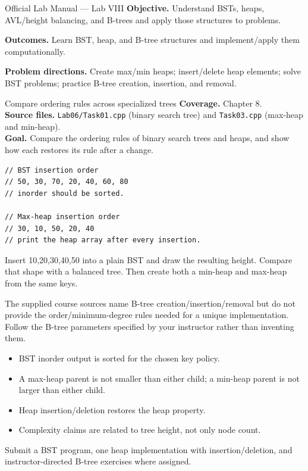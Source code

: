 
\begin{sourcealignment}{Official Lab Manual --- Lab VIII}
\textbf{Objective.} Understand BSTs, heaps, AVL/height balancing, and B-trees and apply those structures to problems.

\textbf{Outcomes.} Learn BST, heap, and B-tree structures and implement/apply them computationally.

\textbf{Problem directions.} Create max/min heaps; insert/delete heap elements; solve BST problems; practice B-tree creation, insertion, and removal.
\end{sourcealignment}

\begin{labproject}{Compare ordering rules across specialized trees}
\textbf{Coverage.} Chapter 8.\\
\textbf{Source files.} \texttt{Lab06/Task01.cpp} (binary search tree) and \texttt{Task03.cpp} (max-heap and min-heap).\\
\textbf{Goal.} Compare the ordering rules of binary search trees and heaps, and show how each restores its rule after a change.

\begin{lstlisting}
// BST insertion order
// 50, 30, 70, 20, 40, 60, 80
// inorder should be sorted.

// Max-heap insertion order
// 30, 10, 50, 20, 40
// print the heap array after every insertion.
\end{lstlisting}

\begin{tryit}
Insert 10,20,30,40,50 into a plain BST and draw the resulting height. Compare that shape with a balanced tree. Then create both a min-heap and max-heap from the same keys.
\end{tryit}

\begin{labmode}
The supplied course sources name B-tree creation/insertion/removal but do not provide the order/minimum-degree rules needed for a unique implementation. Follow the B-tree parameters specified by your instructor rather than inventing them.
\end{labmode}
\end{labproject}

\begin{verification}
\begin{itemize}
  \item BST inorder output is sorted for the chosen key policy.
  \item A max-heap parent is not smaller than either child; a min-heap parent is not larger than either child.
  \item Heap insertion/deletion restores the heap property.
  \item Complexity claims are related to tree height, not only node count.
\end{itemize}
\end{verification}

\begin{labdeliverable}
Submit a BST program, one heap implementation with insertion/deletion, and instructor-directed B-tree exercises where assigned.
\end{labdeliverable}
